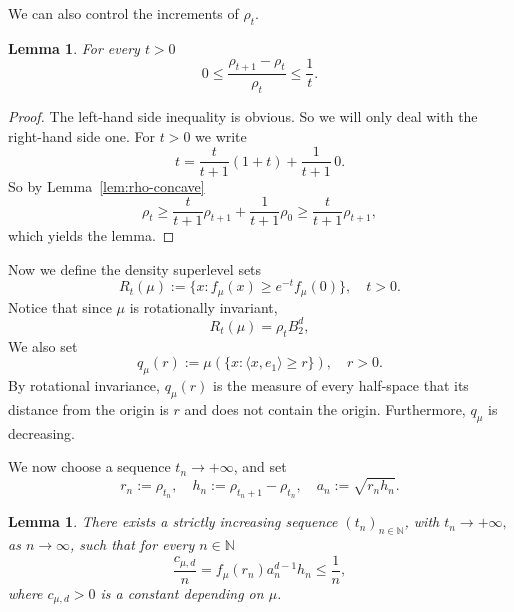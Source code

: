 \documentclass[10pt]{amsart}
\newcommand{\1}{\textbf{1}}
\numberwithin{equation}{section} %
\newtheorem{lemma}[theorem]{Lemma}
\theoremstyle{remark}
\theoremstyle{definition}
\begin{document}
We can also control the increments of $\rho_t$.

\begin{lemma}\label{lem:rho-increments}
For every $t>0$
\[
0 \leq\frac{\rho_{t+1}-\rho_t}{\rho_t} \leq \frac{1}{t}.
\]
\end{lemma}

\begin{proof}
The left-hand side inequality is obvious. So we will only deal with the right-hand side one.
For $t>0$ we write \[t=\frac{t}{t+1}(1+t)+\frac{1}{t+1}\,0.\] So by Lemma~\eqref{lem:rho-concave} \[\rho_t \geq \frac{t}{t+1}\rho_{t+1}+\frac{1}{t+1}\rho_0 \geq \frac{t}{t+1}\rho_{t+1},
\]
 which yields the lemma.
\end{proof}

Now we define the density superlevel sets
\[
R_t(\mu):=\{x:f_\mu(x)\ge e^{-t}f_\mu(0)\}, \quad t>0.
\]
Notice that since \(\mu\) is rotationally invariant,
\[
R_t(\mu)=\rho_tB_2^d,
\]
We also set
\[
q_\mu(r):=\mu(\{x:\langle x,e_1\rangle\ge r\}), \quad r>0.
\]
By rotational invariance, $q_\mu(r)$ is the measure of every half-space that its distance from the origin is $r$ and does not contain the origin. Furthermore,  $q_\mu$ is decreasing.

We now choose a sequence \(t_n\to+\infty\), and set
\begin{equation}\label{eq:r-h-a}
r_n:=\rho_{t_n},
\quad
h_n:=\rho_{t_n+1}-\rho_{t_n},
\quad
a_n:=\sqrt{r_n h_n}.
\end{equation}


\begin{lemma}\label{lem:choice-tn}
There exists a strictly increasing sequence $(t_n)_{n \in \mathbb{N}}$, with \(t_n\to+\infty,\) as $n \to \infty$, such that for every $n \in \mathbb{N}$
\[
\frac{c_{\mu,d}}{n} = f_\mu(r_n)a_n^{d-1}h_n\leq \frac1n,
\] where $c_{\mu,d}>0$ is a constant depending on $\mu$. 
\end{lemma}
\end{document}
